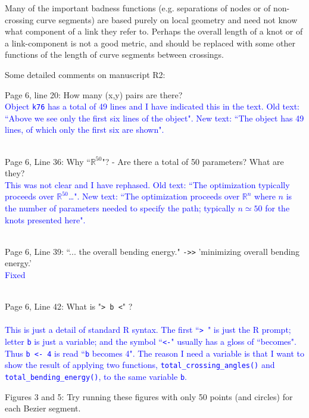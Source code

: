 \documentclass[12pt]{article}
\begin{document}
Many of the important badness functions (e.g. separations of nodes or
of non-crossing curve segments) are based purely on local geometry and
need not know what component of a link they refer to.  Perhaps the
overall length of a knot or of a link-component is not a good metric,
and should be replaced with some other functions of the length of
curve segments between crossings.

Some detailed comments on manuscript R2:

Page 6, line 20: How many (x,y) pairs are there?
\textcolor{blue}{\\Object {\tt k76} has a total of 49 lines and I have
  indicated this in the text.  Old text: ``Above we see only the first
  six lines of the object".  New text: ``The object has 49 lines, of
  which only the first six are shown".\\ \\}

Page 6, Line 36: Why ``$\mathbb{R}^{50}$"? - Are there a total of 50
parameters?  What are they?  \textcolor{blue}{\\This was not clear and
  I have rephased.  Old text: ``The optimization typically proceeds
  over $\mathbb{R}^{50}$\ldots". New text: ``The optimization
  proceeds over $\mathbb{R}^n$ where $n$ is the number of parameters
  needed to specify the path; typically $n\simeq 50$ for the knots
  presented here".\\ \\}

Page 6, Line 39: ``... the overall bending energy." {\tt ->>} 'minimizing
overall bending energy.'
\textcolor{blue}{\\Fixed\\ \\}

Page 6, Line 42:  What is "{\tt > b <}" ?
\\ \\
\textcolor{blue}{This is just a detail of standard R syntax.  The
  first ``{\tt > }" is just the R prompt; letter {\tt b} is just a
  variable; and the symbol ``{\tt <-}" usually has a gloss of
  ``becomes".  Thus {\tt b <- 4} is read ``{\tt b} becomes 4". The
  reason I need a variable is that I want to show the result of
  applying two functions, {\tt total\_crossing\_angles()} and {\tt
    total\_bending\_energy()}, to the same variable {\tt b}.}


Figures 3 and 5: Try running these figures with only 50 points (and
circles) for each Bezier segment.
\end{document}
